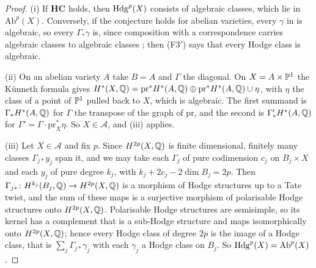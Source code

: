 \begin{proof}
(i) If $\mathbf{HC}$ holds, then $\mathrm{Hdg}^{p}(X)$ consists of algebraic classes,
which lie in $\mathrm{Ab}^{p}(X)$. Conversely, if the conjecture holds for
abelian varieties, every $\gamma$ in  is algebraic, so
every $\Gamma_{*}\gamma$ is, since composition with a correspondence carries
algebraic classes to algebraic classes \cite[Chapter~16]{Ful98}; then
\textup{(F3$'$)} says that every Hodge class is algebraic.

(ii) On an abelian variety $A$ take $B=A$ and $\Gamma$ the diagonal. On
$X=A\times\mathbb{P}^{1}$ the K\"unneth formula gives
$H^{*}(X,\mathbb{Q})=\mathrm{pr}^{*}H^{*}(A,\mathbb{Q})\oplus
\mathrm{pr}^{*}H^{*}(A,\mathbb{Q})\cup\eta$, with $\eta$ the class of a point of
$\mathbb{P}^{1}$ pulled back to $X$, which is algebraic. The first summand is
$\Gamma_{*}H^{*}(A,\mathbb{Q})$ for $\Gamma$ the transpose of the graph of
$\mathrm{pr}$, and the second is $\Gamma'_{*}H^{*}(A,\mathbb{Q})$ for
$\Gamma'=\Gamma\cdot\mathrm{pr}_{X}^{*}\eta$. So $X\in\mathcal{A}$, and
(iii) applies.

(iii) Let $X\in\mathcal{A}$ and fix $p$. Since $H^{2p}(X,\mathbb{Q})$ is finite
dimensional, finitely many classes $\Gamma_{j*}y_{j}$ span it, and we may
take each $\Gamma_{j}$ of pure codimension $c_{j}$ on $B_{j}\times X$ and each
$y_{j}$ of pure degree $k_{j}$, with $k_{j}+2c_{j}-2\dim B_{j}=2p$. Then
$\Gamma_{j*}\colon H^{k_{j}}(B_{j},\mathbb{Q})\to H^{2p}(X,\mathbb{Q})$ is a morphism of
Hodge structures up to a Tate twist, and the sum of these maps is a
surjective morphism of polarisable Hodge structures onto $H^{2p}(X,\mathbb{Q})$.
Polarisable Hodge structures are semisimple, so its kernel has a complement
that is a sub-Hodge structure and maps isomorphically onto $H^{2p}(X,\mathbb{Q})$;
hence every Hodge class of degree $2p$ is the image of a Hodge class, that is
$\sum_{j}\Gamma_{j*}\gamma_{j}$ with each $\gamma_{j}$ a Hodge class on
$B_{j}$. So $\mathrm{Hdg}^{p}(X)=\mathrm{Ab}^{p}(X)$.


\end{proof}
